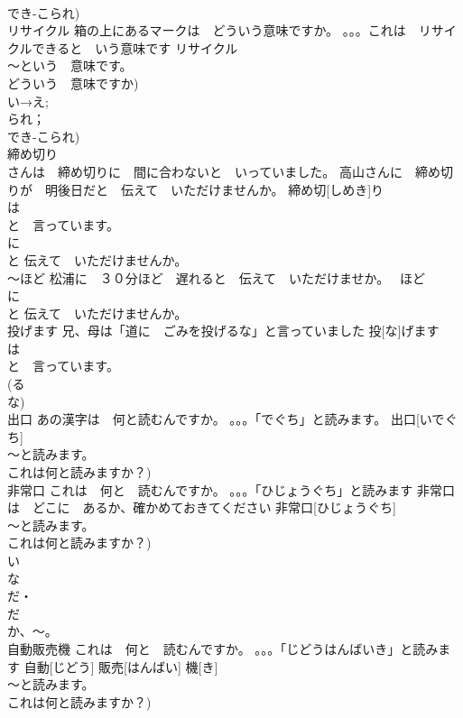 \documentclass[8pt]{extreport}
\begin{document}
\begin{CJK}{UTF8}{min}
\\	でき-こられ)
\\	リサイクル	箱の上にあるマークは　どういう意味ですか。 。。。これは　リサイクルできると　いう意味です	リサイクル			
\\	～という　意味です。
\\	どういう　意味ですか)		
\\	い→え;
\\	られ；
\\	でき-こられ)
\\	締め切り	
\\	さんは　締め切りに　間に合わないと　いっていました。 高山さんに　締め切りが　明後日だと　伝えて　いただけませんか。	締め切[しめき]り			
\\	は
\\	と　言っています。
\\	に
\\	と 伝えて　いただけませんか。
\\	～ほど	松浦に　３０分ほど　遅れると　伝えて　いただけませか。	~ほど			
\\	に
\\	と 伝えて　いただけませんか。
\\	投げます	兄、母は「道に　ごみを投げるな」と言っていました	投[な]げます			
\\	は
\\	と　言っています。
\\	(る
\\	な)
\\	出口	あの漢字は　何と読むんですか。 。。。「でぐち」と読みます。	出口[いでぐち]			
\\	～と読みます。
\\	これは何と読みますか？)	
\\	非常口	これは　何と　読むんですか。 。。。「ひじょうぐち」と読みます 非常口は　どこに　あるか、確かめておきてください	非常口[ひじょうぐち]			
\\	～と読みます。
\\	これは何と読みますか？) 
\\	い　
\\	な
\\	だ・
\\	だ 
\\	か、～。
\\	自動販売機	これは　何と　読むんですか。 。。。「じどうはんばいき」と読みます	自動[じどう] 販売[はんばい] 機[き]			
\\	～と読みます。
\\	これは何と読みますか？)	

\end{CJK}
\end{document}
